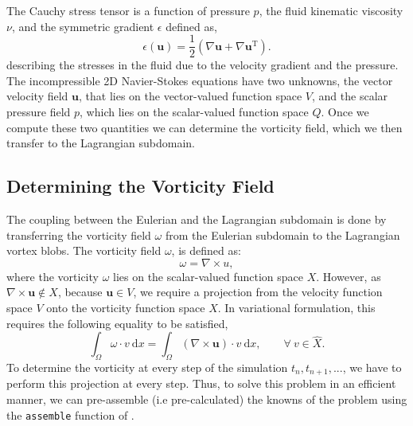The Cauchy stress tensor is a function of pressure $p$, the fluid kinematic viscosity $\nu$, and the symmetric gradient $\epsilon$ defined as,
	\begin{equation}
	\epsilon(\mathbf{u}) = \frac{1}{2} \left(\nabla \mathbf{u} + \nabla \mathbf{u}^{\mathrm{T}}\right).
	\label{eq:symGrad}
	\end{equation}
describing the stresses in the fluid due to the velocity gradient and the pressure. The incompressible 2D Navier-Stokes equations have two unknowns, the vector velocity field $\mathbf{u}$, that lies on the vector-valued function space $V$, and the scalar pressure field $p$, which lies on the scalar-valued function space $Q$. Once we compute these two quantities we can determine the vorticity field, which we then transfer to the Lagrangian subdomain. 

\subsection{Determining the Vorticity Field}
\label{subsec:dtvf}

The coupling between the Eulerian and the Lagrangian subdomain is done by transferring the vorticity field $\omega$ from the Eulerian subdomain to the Lagrangian vortex blobs. The vorticity field $\omega$, is defined as:
	\begin{equation}
	\omega = \nabla \times u,
	\label{eq:vorticityEq}
	\end{equation}
where the vorticity $\omega$ lies on the scalar-valued function space $X$. However, as $\nabla\times\mathbf{u}\notin{X}$, because $\mathbf{u}\in V$, we require a projection from the velocity function space $V$ onto the vorticity function space $X$. In variational formulation, this requires the following equality to be satisfied,
	\begin{equation}
	\int_{\Omega} \omega \cdot v\ \mathrm{d}x = \int_{\Omega} (\nabla \times \mathbf{u}) \cdot v\ \mathrm{d}x, \qquad \forall\ v \in \hat{X}.
	\label{eq:variationalFormulationofVorticity}
	\end{equation}
To determine the vorticity at every step of the simulation $t_n, t_{n+1}, ...$, we have to perform this projection at every step. Thus, to solve this problem in an efficient manner, we can pre-assemble (i.e pre-calculated) the knowns of the problem using the \texttt{assemble} function of \dolfin. 

